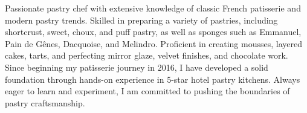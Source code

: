 

\begin{cvparagraph}

Passionate pastry chef with extensive knowledge of classic French patisserie and modern pastry trends. Skilled in preparing a variety of pastries, including shortcrust, sweet, choux, and puff pastry, as well as sponges such as Emmanuel, Pain de Gênes, Dacquoise, and Melindro. Proficient in creating mousses, layered cakes, tarts, and perfecting mirror glaze, velvet finishes, and chocolate work. Since beginning my patisserie journey in 2016, I have developed a solid foundation through hands-on experience in 5-star hotel pastry kitchens. Always eager to learn and experiment, I am committed to pushing the boundaries of pastry craftsmanship.
\end{cvparagraph}
